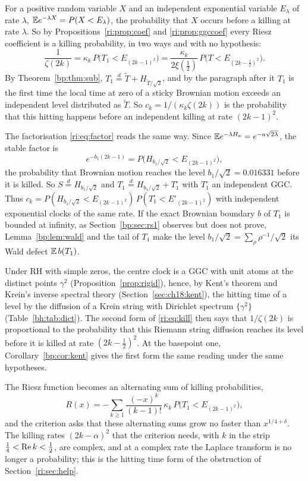 For a positive random variable $X$ and an independent exponential variable $E_\lambda$ of rate $\lambda$, $\mathbb{E} e^{-\lambda X}=P(X<E_\lambda)$, the probability that $X$ occurs before a killing at rate $\lambda$. So by Propositions~\ref{ri:prop:coef} and \ref{ri:prop:ggccoef} every Riesz coefficient is a killing probability, in two ways and with no hypothesis:
\begin{equation}\label{ri:eq:kill}
\frac1{\zeta(2k)}=\kappa_k\,P\big(T_1<E_{(2k-1)^2}\big)=\frac{\kappa_k}{2\xi(\frac12)}\,P\big(T<E_{(2k-\frac12)^2}\big).
\end{equation}
By Theorem~\ref{bp:thm:sub}, $T_1\stackrel d=\widetilde T+H_{\widetilde T/\sqrt2}$, and by the paragraph after it $T_1$ is the first time the local time at zero of a sticky Brownian motion exceeds an independent level distributed as $\widetilde T$. So $c_k=1/(\kappa_k\zeta(2k))$ is the probability that this hitting happens before an independent killing at rate $(2k-1)^2$.

The factorisation \eqref{ri:eq:factor} reads the same way. Since $\mathbb{E} e^{-\lambda H_a}=e^{-a\sqrt{2\lambda}}$, the stable factor is
\[
e^{-b_1(2k-1)}=P\big(H_{b_1/\sqrt2}<E_{(2k-1)^2}\big),
\]
the probability that Brownian motion reaches the level $b_1/\sqrt2=0.016331$ before it is killed. So $S\stackrel d=H_{b_1/\sqrt2}$ and $T_1\stackrel d=H_{b_1/\sqrt2}+T_1^\circ$ with $T_1^\circ$ an independent GGC. Thus $c_k=P(H_{b_1/\sqrt2}<E_{(2k-1)^2})\,P(T_1^\circ<E'_{(2k-1)^2})$ with independent exponential clocks of the same rate. If the exact Brownian boundary $b$ of $T_1$ is bounded at infinity, as Section~\ref{bp:sec:rs1} observes but does not prove, Lemma~\ref{bp:lem:wald} and the tail of $T_1$ make the level $b_1/\sqrt2=\sum_\rho\rho^{-1}/\sqrt2$ its Wald defect $\mathbb{E}\,b(T_1)$.

Under RH with simple zeros, the centre clock is a GGC with unit atoms at the distinct points $\gamma^2$ (Proposition~\ref{prop:rigid}), hence, by Kent's theorem and Krein's inverse spectral theory (Section~\ref{sec:ch18:kent}), the hitting time of a level by the diffusion of a Krein string with Dirichlet spectrum $\{\gamma^2\}$ (Table~\ref{bh:tab:dict}). The second form of \eqref{ri:eq:kill} then says that $1/\zeta(2k)$ is proportional to the probability that this Riemann string diffusion reaches its level before it is killed at rate $(2k-\frac12)^2$. At the basepoint one, Corollary~\ref{bp:cor:kent} gives the first form the same reading under the same hypotheses.

The Riesz function becomes an alternating sum of killing probabilities,
\[
R(x)=-\sum_{k\ge1}\frac{(-x)^k}{(k-1)!}\,\kappa_k\,P\big(T_1<E_{(2k-1)^2}\big),
\]
and the criterion asks that these alternating sums grow no faster than $x^{1/4+\delta}$. The killing rates $(2k-\alpha)^2$ that the criterion needs, with $k$ in the strip $\frac14<\operatorname{Re} k<\frac12$, are complex, and at a complex rate the Laplace transform is no longer a probability; this is the hitting time form of the obstruction of Section~\ref{ri:sec:help}.

